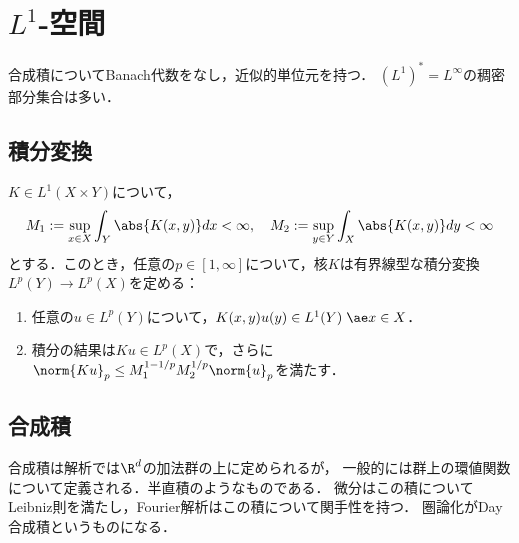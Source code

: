 \documentclass[uplatex, dvipdfmx]{jsreport}
\begin{document}
\section{$L^1$-空間}

\begin{tcolorbox}[colframe=ForestGreen, colback=ForestGreen!10!white,breakable,colbacktitle=ForestGreen!40!white,coltitle=black,fonttitle=\bfseries\sffamily,
title=]
    合成積についてBanach代数をなし，近似的単位元を持つ．
    $(L^1)^*=L^\infty$の稠密部分集合は多い．
\end{tcolorbox}

\subsection{積分変換}

\begin{lemma}[Schur]
    $K\in L^1(X\times Y)$について，
    \[M_1:=\sup_{x\in X}\int_Y\abs{K(x,y)}dx<\infty,\quad M_2:=\sup_{y\in Y}\int_X\abs{K(x,y)}dy<\infty\]
    とする．このとき，任意の$p\in[1,\infty]$について，核$K$は有界線型な積分変換$L^p(Y)\to L^p(X)$を定める：
    \begin{enumerate}
        \item 任意の$u\in L^p(Y)$について，$K(x,y)u(y)\in L^1(Y)\;\ae x\in X$．
        \item 積分の結果は$Ku\in L^p(X)$で，さらに$\norm{Ku}_p\le M_1^{1-1/p}M_2^{1/p}\norm{u}_p$を満たす．
    \end{enumerate}
\end{lemma}

\subsection{合成積}

\begin{tcolorbox}[colframe=ForestGreen, colback=ForestGreen!10!white,breakable,colbacktitle=ForestGreen!40!white,coltitle=black,fonttitle=\bfseries\sffamily,
    title=]
    合成積は解析では$\R^d$の加法群の上に定められるが，
    一般的には群上の環値関数について定義される．半直積のようなものである．
    微分はこの積についてLeibniz則を満たし，Fourier解析はこの積について関手性を持つ．
    圏論化がDay合成積というものになる．
\end{tcolorbox}
\end{document}
